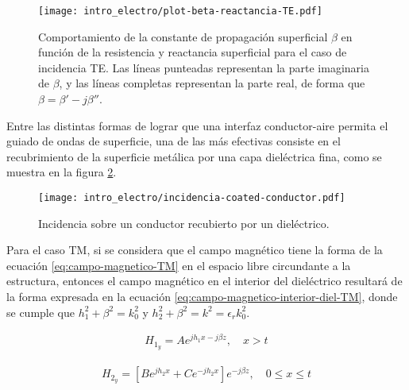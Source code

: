 \begin{figure}[htp]
	\centering
	\texttt{[image: intro\_electro/plot-beta-reactancia-TE.pdf]}
	\caption{Comportamiento de la constante de propagación superficial $\beta$ en función de la resistencia y reactancia superficial para el caso de incidencia TE. Las líneas punteadas representan la parte imaginaria de $\beta$, y las líneas completas representan la parte real, de forma que $\beta = \beta' - j\beta''$.}
	\label{fig:beta-reactancia-TE}
\end{figure}

Entre las distintas formas de lograr que una interfaz conductor-aire permita el guiado de ondas de superficie, una de las más efectivas consiste en el recubrimiento de la superficie metálica por una capa dieléctrica fina, como se muestra en la figura \ref{fig:thin-dielectric-coating}.

\begin{figure}[htp]
	\centering
	\texttt{[image: intro\_electro/incidencia-coated-conductor.pdf]}
	\caption{Incidencia sobre un conductor recubierto por un dieléctrico.}
	\label{fig:thin-dielectric-coating}
\end{figure}

Para el caso TM, si se considera que el campo magnético tiene la forma de la ecuación \ref{eq:campo-magnetico-TM} en el espacio libre circundante a la estructura, entonces el campo magnético en el interior del dieléctrico resultará de la forma expresada en la ecuación \ref{eq:campo-magnetico-interior-diel-TM}, donde se cumple que $h_1^2 + \beta^2 = k_0^2$ y $h_2^2 + \beta^2 = k^2 = \epsilon_r k_0^2$.

\begin{align}
	\label{eq:campo-magnetico-TM}
	H_{1_y} = A e^{jh_1x - j \beta z},\quad x>t
\end{align}

\begin{align}
	\label{eq:campo-magnetico-interior-diel-TM}
	H_{2_y} = [B e^{jh_2 x} + C e^{-jh_2 x}] e^{-j\beta z},\quad  0\leq x \leq t
\end{align}

